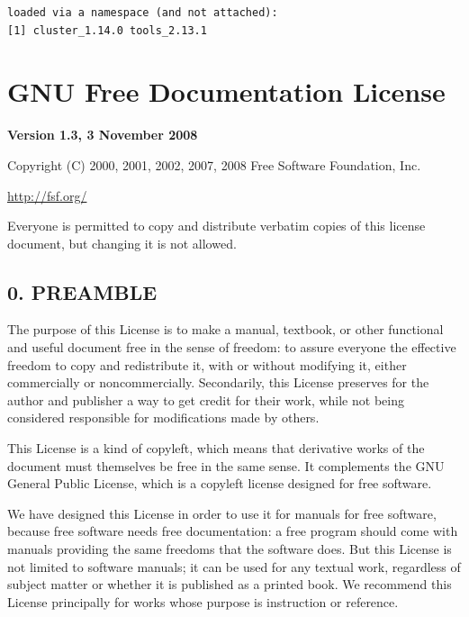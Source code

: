 \documentclass[captions=tableheading]{scrbook}
\begin{document}
\begin{example}
\begin{verbatim}
loaded via a namespace (and not attached):
[1] cluster_1.14.0 tools_2.13.1
\end{verbatim}

\vfill{}
\chapter{GNU Free Documentation License}
\label{sec-18}
\label{cha-GNU-Free-Documentation}


\begin{center}
\textbf{\large Version 1.3, 3 November 2008}\bigskip{}

\par\end{center}

\noindent Copyright (C) 2000, 2001, 2002, 2007, 2008 Free Software
Foundation, Inc.

\begin{center}
\url{http://fsf.org/}
\par\end{center}

\noindent 
Everyone is permitted to copy and distribute verbatim copies of this license document, but changing it is not allowed.
\section{0. PREAMBLE}
\label{sec-18-1}


The purpose of this License is to make a manual, textbook, or other functional and useful document free  in the sense of freedom: to assure everyone the effective freedom to copy and redistribute it, with or without modifying it, either commercially or noncommercially. Secondarily, this License preserves for the author and publisher a way to get credit for their work, while not being considered responsible for modifications made by others.

This License is a kind of copyleft, which means that derivative works of the document must themselves be free in the same sense. It complements the GNU General Public License, which is a copyleft license designed for free software.

We have designed this License in order to use it for manuals for free software, because free software needs free documentation: a free program should come with manuals providing the same freedoms that the software does. But this License is not limited to software manuals; it can be used for any textual work, regardless of subject matter or whether it is published as a printed book. We recommend this License principally for works whose purpose is instruction or reference.

\end{example}
\end{document}

